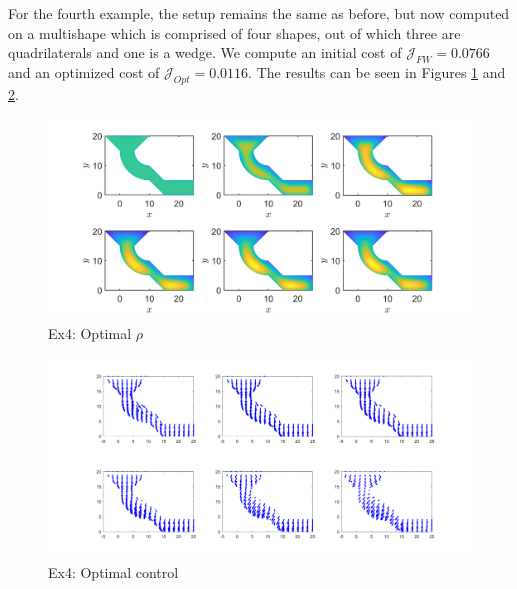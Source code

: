 \documentclass[final]{siamltex}
\begin{document}
For the fourth example, the setup remains the same as before, but now computed on a multishape which is comprised of four shapes, out of which three are quadrilaterals and one is a wedge. We compute an initial cost of $\mathcal J_{FW} = 0.0766$ and an optimized cost of $\mathcal J_{Opt} = 0.0116$. The results can be seen in Figures \ref{FM1a} and \ref{FM2a}.
\begin{figure}[h]
	\centering
	\includegraphics[scale=0.25]{MultiOpt2.png}
	\caption{Ex4: Optimal $\rho$} 
	\label{FM1a}
\end{figure}
\begin{figure}[h]
	\centering
	\includegraphics[scale=0.25]{MultiCont2.png}
	\caption{Ex4: Optimal control} 
	\label{FM2a}
\end{figure}
\end{document}
